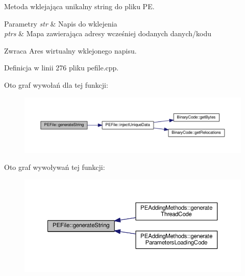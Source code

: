 Metoda wklejająca unikalny string do pliku P\-E. 


\begin{DoxyParams}{Parametry}
{\em str} & Napis do wklejenia \\
\hline
{\em ptrs} & Mapa zawierająca adresy wcześniej dodanych danych/kodu \\
\hline
\end{DoxyParams}
\begin{DoxyReturn}{Zwraca}
Ares wirtualny wklejonego napisu. 
\end{DoxyReturn}


Definicja w linii 276 pliku pefile.\-cpp.



Oto graf wywołań dla tej funkcji\-:
\nopagebreak
\begin{figure}[H]
\begin{center}
\leavevmode
\includegraphics[width=350pt]{class_p_e_file_a2dca67d21245ba63171ee34456456f96_cgraph}
\end{center}
\end{figure}




Oto graf wywoływań tej funkcji\-:
\nopagebreak
\begin{figure}[H]
\begin{center}
\leavevmode
\includegraphics[width=350pt]{class_p_e_file_a2dca67d21245ba63171ee34456456f96_icgraph}
\end{center}
\end{figure}


